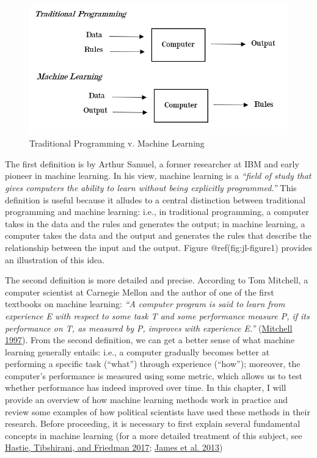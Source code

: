 \documentclass{book}
\begin{document}
\begin{figure}
\hypertarget{fig:jl-figure1}{%
\centering
\includegraphics{images/ml/jl-figure1.png}
\caption{Traditional Programming v. Machine Learning}\label{fig:jl-figure1}
}
\end{figure}

The first definition is by Arthur Samuel, a former researcher at IBM and early
pioneer in machine learning. In his view, machine learning is a \emph{``field
of study that gives computers the ability to learn without being explicitly
programmed.''} This definition is useful because it alludes to a central
distinction between traditional programming and machine learning: i.e., in
traditional programming, a computer takes in the data and the rules and
generates the output; in machine learning, a computer takes the data and the
output and generates the rules that describe the relationship between the
input and the output. Figure @ref(fig:jl-figure1) provides an illustration of
this idea.

The second definition is more detailed and precise. According to Tom Mitchell,
a computer scientist at Carnegie Mellon and the author of one of the first
textbooks on machine learning: \emph{``A computer program is said to learn
from experience E with respect to some task T and some performance measure P,
if its performance on T, as measured by P, improves with experience E.''}
(\protect\hyperlink{ref-mitchell1997a}{Mitchell 1997}). From the second
definition, we can get a better sense of what machine learning generally
entails: i.e., a computer gradually becomes better at performing a specific
task (``what'') through experience (``how''); moreover, the computer's
performance is measured using some metric, which allows us to test whether
performance has indeed improved over time. In this chapter, I will provide an
overview of how machine learning methods work in practice and review some
examples of how political scientists have used these methods in their
research. Before proceeding, it is necessary to first explain several
fundamental concepts in machine learning (for a more detailed treatment of
this subject, see \protect\hyperlink{ref-hastie2017a}{Hastie, Tibshirani, and
Friedman 2017}; \protect\hyperlink{ref-james2013a}{James et al. 2013})
\end{document}

